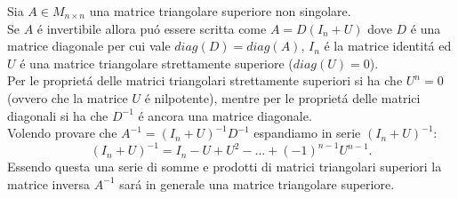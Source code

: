 Sia $A \in M_{n \times n}$ una matrice triangolare superiore non singolare.\\
Se $A$ \'e invertibile allora pu\'o essere scritta come $A=D(\mathit{I_n}+U)$ dove $D$ \'e una matrice diagonale per cui vale $diag(D)=diag(A)$, $\mathit{I_n}$ \'e la matrice identit\'a ed $U$ \'e una matrice triangolare strettamente superiore ($diag(U)=0$).\\
Per le propriet\'a delle matrici triangolari strettamente superiori si ha che $U^n = 0$ (ovvero che la matrice $U$ \'e nilpotente), mentre per le propriet\'a delle matrici diagonali si ha che $D^{-1}$ \'e ancora una matrice diagonale.
\\
Volendo provare che $A^{-1}=(\mathit{I_n}+U)^{-1}D^{-1}$ espandiamo in serie $ (\mathit{I_n}+U)^{-1}$:
\[
(\mathit{I_n}+U)^{-1}=\mathit{I_n}-U+U^2-...+(-1)^{n-1}U^{n-1}.
\]
Essendo questa una serie di somme e prodotti di matrici triangolari superiori la matrice inversa $A^{-1}$ sar\'a in generale una matrice triangolare superiore.